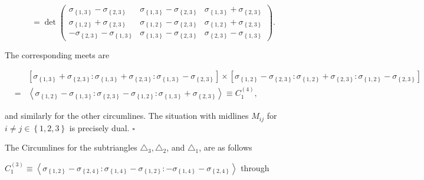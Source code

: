\documentclass[11pt]{article}
\begin{document}
\begin{equation*}
=\det \left( 
\begin{array}{ccc}
\sigma _{\left\{ 1,3\right\} }-\sigma _{\left\{ 2,3\right\} } & \sigma
_{\left\{ 1,3\right\} }-\sigma _{\left\{ 2,3\right\} } & \sigma _{\left\{
1,3\right\} }+\sigma _{\left\{ 2,3\right\} } \\ 
\sigma _{\left\{ 1,2\right\} }+\sigma _{\left\{ 2,3\right\} } & \sigma
_{\left\{ 1,2\right\} }-\sigma _{\left\{ 2,3\right\} } & \sigma _{\left\{
1,2\right\} }+\sigma _{\left\{ 2,3\right\} } \\ 
-\sigma _{\left\{ 2,3\right\} }-\sigma _{\left\{ 1,3\right\} } & \sigma
_{\left\{ 1,3\right\} }-\sigma _{\left\{ 2,3\right\} } & \sigma _{\left\{
2,3\right\} }-\sigma _{\left\{ 1,3\right\} }%
\end{array}%
\right) .
\end{equation*}

The corresponding meets are

\begin{eqnarray*}
&&\left[ \sigma _{\left\{ 1,3\right\} }+\sigma _{\left\{ 2,3\right\}
}:\sigma _{\left\{ 1,3\right\} }+\sigma _{\left\{ 2,3\right\} }:\sigma
_{\left\{ 1,3\right\} }-\sigma _{\left\{ 2,3\right\} }\right] \times \left[
\sigma _{\left\{ 1,2\right\} }-\sigma _{\left\{ 2,3\right\} }:\sigma
_{\left\{ 1,2\right\} }+\sigma _{\left\{ 2,3\right\} }:\sigma _{\left\{
1,2\right\} }-\sigma _{\left\{ 2,3\right\} }\right]  \\
&=&\left\langle \sigma _{\left\{ 1,2\right\} }-\sigma _{\left\{ 1,3\right\}
}:\sigma _{\left\{ 2,3\right\} }-\sigma _{\left\{ 1,2\right\} }:\sigma
_{\left\{ 1,3\right\} }+\sigma _{\left\{ 2,3\right\} }\right\rangle \equiv
C_{1}^{\left( 4\right) },
\end{eqnarray*}

and similarly for the other circumlines. The situation with midlines $M_{ij}$
for $i\neq j\in \left\{ 1,2,3\right\} $ is precisely dual. $\square $

\bigskip

The Circumlines for the subtriangles $\triangle _{3},\triangle _{2}$, and $%
\triangle _{1}$, are as follows

$C_{1}^{\left( 3\right) }\equiv \left\langle \sigma _{\left\{ 1,2\right\}
}-\sigma _{\left\{ 2,4\right\} }:\sigma _{\left\{ 1,4\right\} }-\sigma
_{\left\{ 1,2\right\} }:-\sigma _{\left\{ 1,4\right\} }-\sigma _{\left\{
2,4\right\} }\right\rangle $ through
\end{document}
